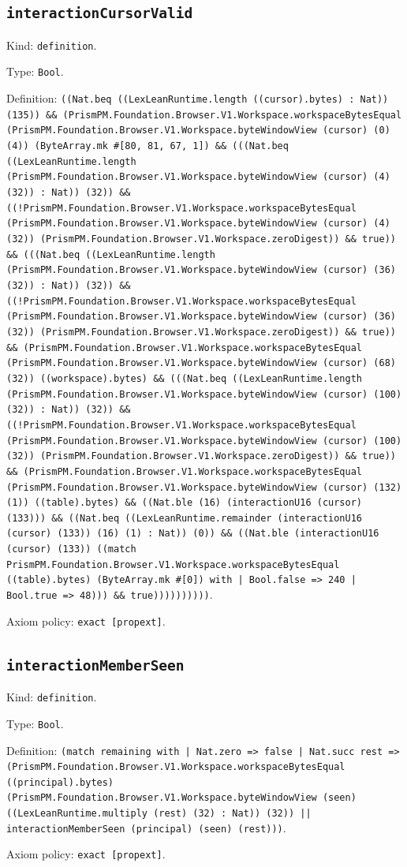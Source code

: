 \documentclass[11pt]{article}
\begin{document}
\subsection*{\texttt{interactionCursorValid}}
\noindent Kind: \texttt{definition}.\par
\noindent Type: \texttt{Bool}.\par
\noindent Definition: \texttt{((Nat.beq ((LexLeanRuntime.length ((cursor).bytes) : Nat)) (135)) \&\& (PrismPM.Foundation.Browser.V1.Workspace.workspaceBytesEqual (PrismPM.Foundation.Browser.V1.Workspace.byteWindowView (cursor) (0) (4)) (ByteArray.mk \#[80, 81, 67, 1]) \&\& (((Nat.beq ((LexLeanRuntime.length (PrismPM.Foundation.Browser.V1.Workspace.byteWindowView (cursor) (4) (32)) : Nat)) (32)) \&\& ((!PrismPM.Foundation.Browser.V1.Workspace.workspaceBytesEqual (PrismPM.Foundation.Browser.V1.Workspace.byteWindowView (cursor) (4) (32)) (PrismPM.Foundation.Browser.V1.Workspace.zeroDigest)) \&\& true)) \&\& (((Nat.beq ((LexLeanRuntime.length (PrismPM.Foundation.Browser.V1.Workspace.byteWindowView (cursor) (36) (32)) : Nat)) (32)) \&\& ((!PrismPM.Foundation.Browser.V1.Workspace.workspaceBytesEqual (PrismPM.Foundation.Browser.V1.Workspace.byteWindowView (cursor) (36) (32)) (PrismPM.Foundation.Browser.V1.Workspace.zeroDigest)) \&\& true)) \&\& (PrismPM.Foundation.Browser.V1.Workspace.workspaceBytesEqual (PrismPM.Foundation.Browser.V1.Workspace.byteWindowView (cursor) (68) (32)) ((workspace).bytes) \&\& (((Nat.beq ((LexLeanRuntime.length (PrismPM.Foundation.Browser.V1.Workspace.byteWindowView (cursor) (100) (32)) : Nat)) (32)) \&\& ((!PrismPM.Foundation.Browser.V1.Workspace.workspaceBytesEqual (PrismPM.Foundation.Browser.V1.Workspace.byteWindowView (cursor) (100) (32)) (PrismPM.Foundation.Browser.V1.Workspace.zeroDigest)) \&\& true)) \&\& (PrismPM.Foundation.Browser.V1.Workspace.workspaceBytesEqual (PrismPM.Foundation.Browser.V1.Workspace.byteWindowView (cursor) (132) (1)) ((table).bytes) \&\& ((Nat.ble (16) (interactionU16 (cursor) (133))) \&\& ((Nat.beq ((LexLeanRuntime.remainder (interactionU16 (cursor) (133)) (16) (1) : Nat)) (0)) \&\& ((Nat.ble (interactionU16 (cursor) (133)) ((match PrismPM.Foundation.Browser.V1.Workspace.workspaceBytesEqual ((table).bytes) (ByteArray.mk \#[0]) with | Bool.false => 240 | Bool.true => 48))) \&\& true))))))))))}.\par
\noindent Axiom policy: \texttt{exact [propext]}.\par
\subsection*{\texttt{interactionMemberSeen}}
\noindent Kind: \texttt{definition}.\par
\noindent Type: \texttt{Bool}.\par
\noindent Definition: \texttt{(match remaining with | Nat.zero => false | Nat.succ rest => (PrismPM.Foundation.Browser.V1.Workspace.workspaceBytesEqual ((principal).bytes) (PrismPM.Foundation.Browser.V1.Workspace.byteWindowView (seen) ((LexLeanRuntime.multiply (rest) (32) : Nat)) (32)) || interactionMemberSeen (principal) (seen) (rest)))}.\par
\noindent Axiom policy: \texttt{exact [propext]}.\par
\end{document}
